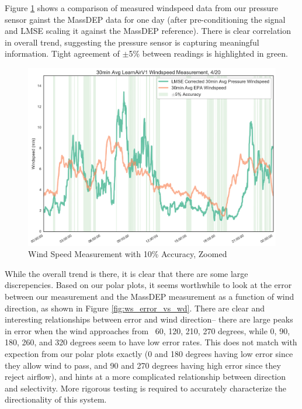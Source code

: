 Figure \ref{fig:ws_with_10_accuracy_zoomed} shows a comparison of measured windspeed data from our pressure sensor gainst the MassDEP data for one day (after pre-conditioning the signal and LMSE scaling it against the MassDEP reference).  There is clear correlation in overall trend, suggesting the pressure sensor is capturing meaningful information.  Tight agreement of $\pm$5\% between readings is highlighted in green.   

\begin{figure}[htb]
 	\includegraphics[width=\textwidth]{figs/ws_with_10_accuracy_zoomed}               
 	 \caption{Wind Speed Measurement with 10\% Accuracy, Zoomed}
  	\label{fig:ws_with_10_accuracy_zoomed}
\end{figure}

While the overall trend is there, it is clear that there are some large discrepencies.  Based on our polar plots, it seems worthwhile to look at the error between our measurement and the MassDEP measurement as a function of wind direction, as shown in Figure \ref{fig:ws_error_vs_wd}.  There are clear and interesting relationships between error and wind direction-- there are large peaks in error when the wind approaches from ~60, 120, 210, 270 degrees, while 0, 90, 180, 260, and 320 degrees seem to have low error rates.  This does not match with expection from our polar plots exactly (0 and 180 degrees having low error since they allow wind to pass, and 90 and 270 degrees having high error since they reject airflow), and hints at a more complicated relationship between direction and selectivity.  More rigorous testing is required to accurately characterize the directionality of this system.


